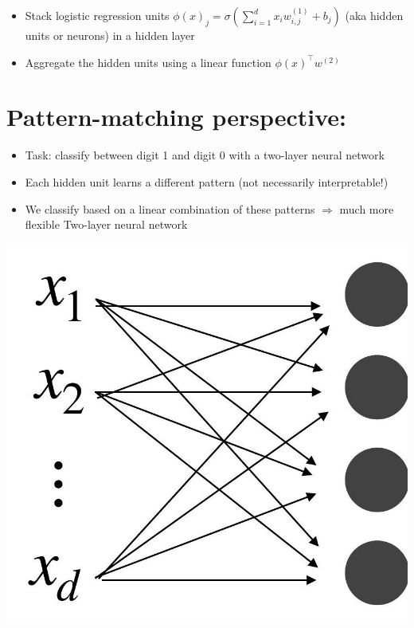 \documentclass[10pt]{article}
\begin{document}
\begin{itemize}
  \item Stack logistic regression units $\phi(x)_{j}=\sigma\left(\sum_{i=1}^{d} x_{i} w_{i, j}^{(1)}+b_{j}\right)$ (aka hidden units or neurons) in a hidden layer

  \item Aggregate the hidden units using a linear function $\phi(x)^{\top} w^{(2)}$

\end{itemize}

\section*{Pattern-matching perspective:}
\begin{itemize}
  \item Task: classify between digit 1 and digit 0 with a two-layer neural network

  \item Each hidden unit learns a different pattern (not necessarily interpretable!)

  \item We classify based on a linear combination of these patterns $\Rightarrow$ much more flexible
Two-layer neural network

\end{itemize}

\begin{center}
\includegraphics[max width=\textwidth]{2024_01_08_0e0dcffe4bc8c6049046g-07}
\end{center}
\end{document}
